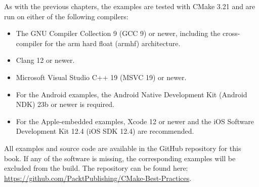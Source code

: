 As with the previous chapters, the examples are tested with CMake 3.21 and are run on either of the following compilers:

\begin{itemize}
\item 
The GNU Compiler Collection 9 (GCC 9) or newer, including the cross-compiler for the arm hard float (armhf) architecture.

\item 
Clang 12 or newer.

\item 
Microsoft Visual Studio C++ 19 (MSVC 19) or newer.

\item 
For the Android examples, the Android Native Development Kit (Android NDK) 23b or newer is required.

\item 
For the Apple-embedded examples, Xcode 12 or newer and the iOS Software Development Kit 12.4 (iOS SDK 12.4) are recommended.
\end{itemize}

All examples and source code are available in the GitHub repository for this book. If any of the software is missing, the corresponding examples will be excluded from the build. The repository can be found here: \url{https://github.com/PacktPublishing/CMake-Best-Practices}.



















